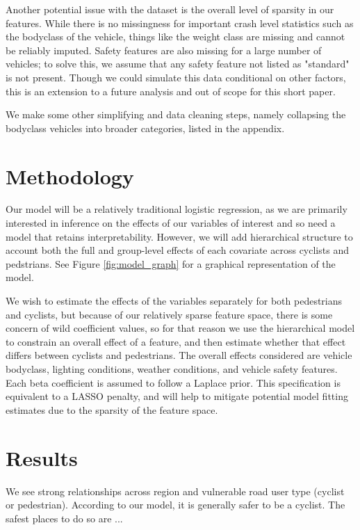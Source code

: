 \documentclass[12pt]{article}
\begin{document}
Another potential issue with the dataset is the overall level of sparsity in our features. While there is no 
missingness for important crash level statistics such as the bodyclass of the vehicle, things like the weight class
are missing and cannot be reliably imputed. Safety features are also missing for a large number of vehicles; to solve
this, we assume that any safety feature not listed as "standard" is not present. Though we could simulate this data 
conditional on other factors, this is an extension to a future analysis and out of scope for this short paper.

We make some other simplifying and data cleaning steps, namely collapsing the bodyclass vehicles into broader categories,
listed in the appendix.

\section{Methodology}

Our model will be a relatively traditional logistic regression, as we are primarily interested in inference on the 
effects of our variables of interest and so need a model that retains interpretability. However, we will
add hierarchical structure to account both the full and group-level effects of each covariate across 
cyclists and pedstrians. See Figure \ref{fig:model_graph} for a graphical representation of the model.

We wish to estimate the effects of the variables separately for both pedestrians and cyclists, but because of our 
relatively sparse feature space, there is some concern of wild coefficient values, so for that reason we use the 
hierarchical model to constrain an overall effect of a feature, and then estimate whether that effect differs
between cyclists and pedestrians. The overall effects considered are vehicle bodyclass, lighting conditions, weather 
conditions, and vehicle safety features. Each beta coefficient is assumed to follow a Laplace prior. This specification 
is equivalent to a LASSO penalty\cite{tibshirani_regression_1996}, and will help to mitigate potential model fitting
estimates due to the sparsity of the feature space.

\section{Results}

We see strong relationships across region and vulnerable road user type (cyclist or pedestrian). According to our
model, it is generally safer to be a cyclist. The safest places to do so are ...
\end{document}
